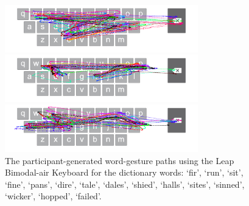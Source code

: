 \begin{figure}[t]
	\begin{minipage}[t]{8in}
	\hspace{-20pt}
	\begin{minipage}[t]{3.1in}
		\includegraphics[width=3.3in]{Figures/fig_wicker_paths}
	\end{minipage}
	\begin{minipage}[t]{3in}
		\includegraphics[width=3.3in]{Figures/fig_hopped_paths}
	\end{minipage}
	\end{minipage}
	
	\begin{minipage}[t]{8in}
	\hspace{-20pt}
	\begin{minipage}[t]{3.1in}
		\includegraphics[width=3.3in]{Figures/fig_failed_paths}
	\end{minipage}
	\end{minipage}
	\caption[User Generated Paths for the Leap Bimodal-air Keyboard]{The participant-generated word-gesture paths using the Leap Bimodal-air Keyboard for the dictionary words: `fir', `run', `sit', `fine', `pans', `dire', `tale', `dales', `shied', `halls', `sites', `sinned', `wicker', `hopped', `failed'.}
\end{figure}

\clearpage

